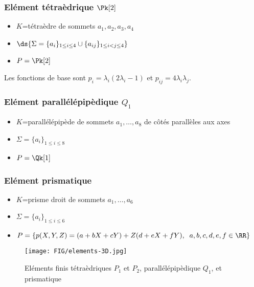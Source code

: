 \subsubsection{Elément tétraèdrique $\Pk[2]$}
\begin{itemize}
\item $K$=tétraèdre de sommets $a_1, a_2, a_3, a_4$
\item $\ds{ \Sigma=\{a_i\}_{1\le i\le 4} \cup \{a_{ij}\}_{1\le i < j \le 4} }$
\item $P=\Pk[2]$
\end{itemize}
%
Les fonctions de base sont $p_i=\lambda_i (2\lambda_i -1)$ et $p_{ij}=4\lambda_i\lambda_j$.
%
%
\subsubsection{Elément parallélépipèdique $Q_1$}
\begin{itemize}
\item $K$=parallélépipède de sommets $a_1, \ldots , a_8$ de c\^otés parallèles aux axes
\item $\Sigma=\{a_i\}_{1\le i\le 8}$
\item $P=\Qk[1]$
\end{itemize}
%
%
\subsubsection{Elément prismatique}
\begin{itemize}
\item $K$=prisme droit de sommets $a_1, \ldots , a_6$
\item $\Sigma=\{a_i\}_{1\le i\le 6}$
\item $P=\{p(X,Y,Z)=(a+bX+cY)+Z(d+eX+fY), \;\; a,b,c,d,e,f \in \RR\}$
\end{itemize}
%
%
\begin{figure}[h]
\begin{center}
\texttt{[image: FIG/elements-3D.jpg]}
\caption{Eléments finis tétraèdriques $P_1$ et $P_2$, parallélépipèdique $Q_1$, et prismatique}
\end{center}
\end{figure}
%
%
